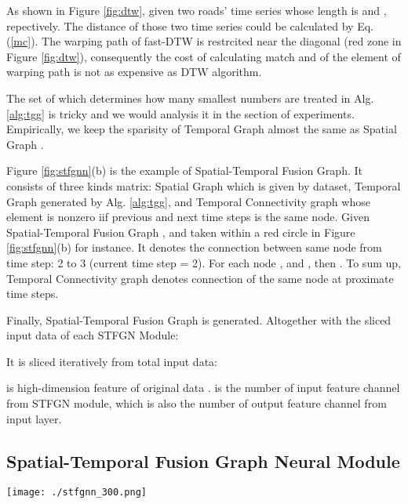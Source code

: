 \documentclass[letterpaper]{article} \usepackage{aaai21}  \usepackage{times}  \usepackage{helvet} \usepackage{courier}  \usepackage[hyphens]{url}  \usepackage{graphicx} \urlstyle{rm} \def\UrlFont{\rm}  \usepackage{natbib}  \usepackage{caption} \frenchspacing  \setlength{\pdfpagewidth}{8.5in}  \setlength{\pdfpageheight}{11in}  \usepackage{multirow}
\begin{document}
As shown in Figure \ref{fig:dtw}, given two roads' time series whose length is  and , repectively. The distance of those two time series  could be calculated by Eq. (\ref{mc}). The warping path of fast-DTW is restrcited near the diagonal (red zone in Figure \ref{fig:dtw}), consequently the cost of calculating match  and  of the element  of warping path \bm{} is not as expensive as DTW algorithm.

The set of  which determines how many smallest numbers are treated in Alg. \ref{alg:tgg} is tricky and we would analysis it in the section of experiments. Empirically, we keep the sparisity of Temporal Graph  almost the same as Spatial Graph .

Figure \ref{fig:stfgnn}(b) is the example of Spatial-Temporal Fusion Graph. It consists of three kinds  matrix: Spatial Graph  which is given by dataset, Temporal Graph  generated by Alg. \ref{alg:tgg}, and Temporal Connectivity graph  whose element is nonzero iif previous and next time steps is the same node. Given Spatial-Temporal Fusion Graph , and taken  within a red circle in Figure \ref{fig:stfgnn}(b) for instance. It denotes the connection between same node from time step: 2 to 3 (current time step  = 2). For each node ,  and , then . To sum up, Temporal Connectivity graph denotes connection of the same node at proximate time steps.

Finally, Spatial-Temporal Fusion Graph  is generated. Altogether with the sliced input data of each STFGN Module: 

It is sliced iteratively from total input data: 


 is high-dimension feature of original data .  is the number of input feature channel from STFGN module, which is also the number of output feature channel from input layer.

\subsection{Spatial-Temporal Fusion Graph Neural Module}
\begin{figure*}[!htb]
	\centering
	\texttt{[image: ./stfgnn\_300.png]}
	\caption{Detailed framework of STFGNN. (a) is the example of input of Spatial-Temporal Fusion Graph, which would be generated iteratively along the time axis. (b) is the example of Spatial-Temporal Fusion Graph, whose size K is 4 and 3, respectively. It consists of three kinds of adjacency matrix : spatial graph , temporal graph  and temporal connectivity graph . The  within a red circle would be taken for instance in the body. (c) is overall structure of STFGNN, its Gated CNN module and STFGNN modules are in parallel. (d) is detailed architecture of the Spatial-Temporal Fusion Graph Modules, each module will be independently trained for input iteratively generated from (a) in parallel as well.}
	\label{fig:stfgnn}
\end{figure*}
\end{document}
